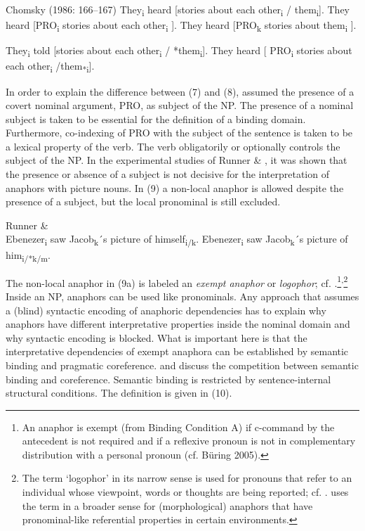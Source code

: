 \documentclass[output=paper]{langsci/langscibook}
\begin{document}
\ea%
    Chomsky (1986: 166–167)\label{ex:wein:7}
\ea  They\textsubscript{i} heard [stories about each other\textsubscript{i} / them\textsubscript{i}].
\ex  They heard [PRO\textsubscript{i} stories about each other\textsubscript{i} ].
\ex  They heard [PRO\textsubscript{k} stories about them\textsubscript{i} ].
    \z
\z

\ea%
    \label{ex:wein:8}
    \ea They\textsubscript{i} told [stories about each other\textsubscript{i} / *them\textsubscript{i}].
    \ex They heard [ PRO\textsubscript{i} stories about each other\textsubscript{i} /them\textsubscript{*i}].
    \z
\z

In order to explain the difference between (7) and (8), \citet{Chomsky1986} assumed the presence of a covert nominal argument, PRO, as subject of the NP. The presence of a nominal subject is taken to be essential for the definition of a binding domain. Furthermore, co-indexing of PRO with the subject of the sentence is taken to be a lexical property of the verb. The verb obligatorily or optionally controls the subject of the NP. In the experimental studies of Runner \& \citet{Kaiser2005}, it was shown that the presence or absence of a subject is not decisive for the interpretation of anaphors with picture nouns. In (9) a non-local anaphor is allowed despite the presence of a subject, but the local pronominal is still excluded.

\ea%
    Runner \& \citet[597]{Kaiser2005}\label{ex:wein:9}\\
    \ea Ebenezer\textsubscript{i} saw Jacob\textsubscript{k}´s picture of himself\textsubscript{i/k}.
    \ex Ebenezer\textsubscript{i} saw Jacob\textsubscript{k}´s picture of him\textsubscript{i/*k/m}.
    \z
\z    

The non-local anaphor in (9a) is labeled an \textit{exempt anaphor} or \textit{logophor}; cf. \citet{Reuland2011}.\footnote{An anaphor is exempt (from Binding Condition A) if c-command by the antecedent is not required and if a reflexive pronoun is not in complementary distribution with a personal pronoun (cf. Büring 2005).}\textsuperscript{,}\footnote{The term ‘logophor’ in its narrow sense is used for pronouns that refer to an individual whose viewpoint, words or thoughts are being reported; cf. \citet{Speas2004}. \citet{Reuland2011} uses the term in a broader sense for (morphological) anaphors that have pronominal-like referential properties in certain environments.}  Inside an NP, anaphors can be used like pronominals. Any approach that assumes a (blind) syntactic encoding of anaphoric dependencies has to explain why anaphors have different interpretative properties inside the nominal domain and why syntactic encoding is blocked. What is important here is that the interpretative dependencies of exempt anaphora can be established by semantic binding and pragmatic coreference. \citet{Reinhart2006} and \citet{Reuland2011} discuss the competition between semantic binding and coreference. Semantic binding is restricted by sentence-internal structural conditions. The definition is given in (10). 
\end{document}

